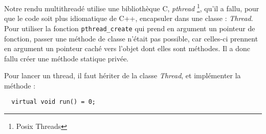   Notre rendu multithreadé utilise une bibliothèque C, \emph{pthread} \footnote{Posix Threads}, qu'il a fallu, pour que le code soit plus idiomatique de C++, 
  encapsuler dans une classe : \emph{Thread}. Pour utiliser la fonction \verb|pthread_create| qui prend en argument un pointeur de fonction, passer une méthode de classe
  n'était pas possible, car celles-ci prennent en argument un pointeur caché vers l'objet dont elles sont méthodes. Il a donc fallu créer une méthode statique privée.
  
  Pour lancer un thread, il faut hériter de la classe \emph{Thread}, et implémenter la méthode :
  \begin{lstlisting}
  virtual void run() = 0;
  \end{lstlisting}